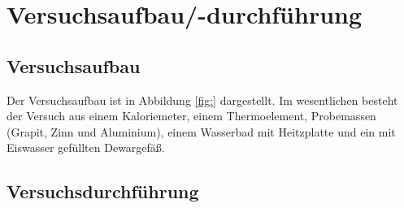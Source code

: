\section{Versuchsaufbau/-durchführung}

\subsection{Versuchsaufbau}

Der Versuchsaufbau ist in Abbildung \ref{fig:} dargestellt.
Im wesentlichen besteht der Versuch aus einem Kaloriemeter, einem Thermoelement,
Probemassen (Grapit, Zinn und Aluminium), einem Wasserbad mit Heitzplatte und
ein mit Eiswasser gefüllten Dewargefäß.

\subsection{Versuchsdurchführung}